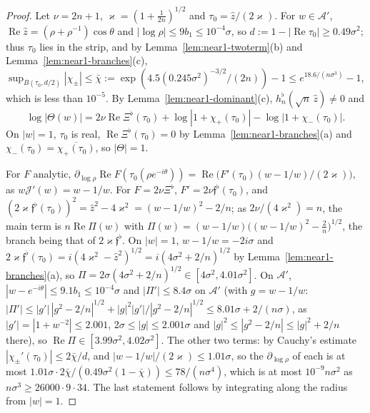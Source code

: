 \documentclass[11pt]{amsart}
\theoremstyle{definition}
\theoremstyle{remark}
\numberwithin{equation}{section}
\DeclareMathOperator{\re}{Re}
\begin{document}
\begin{proof}
Let $\nu=2n+1$, $\varkappa=(1+\frac1{2n})^{1/2}$ and $\tau_0=\hat z/(2\varkappa)$. For $w\in\mathcal A'$, $\re\hat z=(\rho+\rho^{-1})\cos\theta$ and $|\log\rho|\le9b_1\le10^{-4}\sigma$, so $d:=1-|\re\tau_0|\ge0.49\sigma^2$; thus $\tau_0$ lies in the strip, and by Lemma~\ref{lem:near1-twoterm}(b) and Lemma~\ref{lem:near1-branches}(c), $\sup_{B(\tau_0,d/2)}|\chi_\pm|\le\bar\chi:=\exp(4.5(0.245\sigma^2)^{-3/2}/(2n))-1\le e^{18.6/(n\sigma^3)}-1$, which is less than $10^{-5}$. By Lemma~\ref{lem:near1-dominant}(c), $h_n^\flat(\sqrt n\,\hat z)\ne0$ and
\[
\log|\Theta(w)|=2\nu\re\Xi^\flat(\tau_0)+\log|1+\chi_+(\tau_0)|-\log|1+\chi_-(\tau_0)| .
\]
On $|w|=1$, $\tau_0$ is real, $\re\Xi^\flat(\tau_0)=0$ by Lemma~\ref{lem:near1-branches}(a) and $\chi_-(\tau_0)=\overline{\chi_+(\tau_0)}$, so $|\Theta|=1$.

For $F$ analytic, $\partial_{\log\rho}\re F(\tau_0(\rho e^{-i\theta}))=\re\bigl(F'(\tau_0)(w-1/w)/(2\varkappa)\bigr)$, as $w\mathcal J'(w)=w-1/w$. For $F=2\nu\Xi^\flat$, $F'=2\nu\mathfrak f^\flat(\tau_0)$, and $(2\varkappa\mathfrak f^\flat(\tau_0))^2=\hat z^2-4\varkappa^2=(w-1/w)^2-2/n$; as $2\nu/(4\varkappa^2)=n$, the main term is $n\re\Pi(w)$ with $\Pi(w)=(w-1/w)\bigl((w-1/w)^2-\frac2n\bigr)^{1/2}$, the branch being that of $2\varkappa\mathfrak f^\flat$. On $|w|=1$, $w-1/w=-2i\sigma$ and $2\varkappa\mathfrak f^\flat(\tau_0)=i(4\varkappa^2-\hat z^2)^{1/2}=i(4\sigma^2+2/n)^{1/2}$ by Lemma~\ref{lem:near1-branches}(a), so $\Pi=2\sigma(4\sigma^2+2/n)^{1/2}\in[4\sigma^2,4.01\sigma^2]$. On $\mathcal A'$, $|w-e^{-i\theta}|\le9.1b_1\le10^{-4}\sigma$ and $|\Pi'|\le8.4\sigma$ on $\mathcal A'$ (with $g=w-1/w$: $|\Pi'|\le|g'|\,|g^2-2/n|^{1/2}+|g|^2|g'|/|g^2-2/n|^{1/2}\le8.01\sigma+2/(n\sigma)$, as $|g'|=|1+w^{-2}|\le2.001$, $2\sigma\le|g|\le2.001\sigma$ and $|g|^2\le|g^2-2/n|\le|g|^2+2/n$ there), so $\re\Pi\in[3.99\sigma^2,4.02\sigma^2]$. The other two terms: by Cauchy's estimate $|\chi_\pm'(\tau_0)|\le2\bar\chi/d$, and $|w-1/w|/(2\varkappa)\le1.01\sigma$, so the $\partial_{\log\rho}$ of each is at most $1.01\sigma\cdot2\bar\chi/(0.49\sigma^2(1-\bar\chi))\le78/(n\sigma^4)$, which is at most $10^{-9}n\sigma^2$ as $n\sigma^3\ge26000\cdot9\cdot34$. The last statement follows by integrating along the radius from $|w|=1$.
\end{proof}
\end{document}
